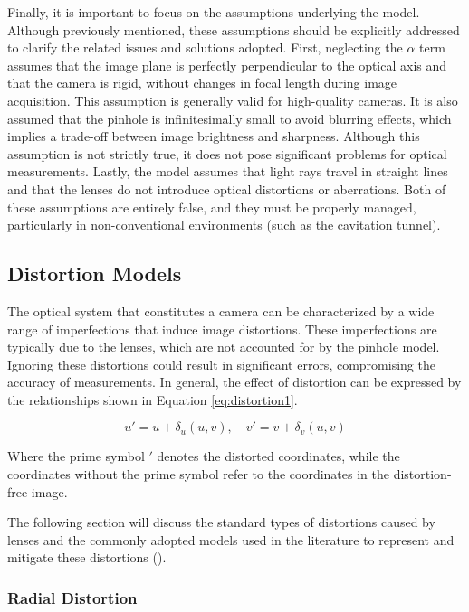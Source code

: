Finally, it is important to focus on the assumptions underlying the model. Although previously mentioned, these assumptions should be explicitly addressed to clarify the related issues and solutions adopted.
First, neglecting the $\alpha$ term assumes that the image plane is perfectly perpendicular to the optical axis and that the camera is rigid, without changes in focal length during image acquisition. This assumption is generally valid for high-quality cameras. It is also assumed that the pinhole is infinitesimally small to avoid blurring effects, which implies a trade-off between image brightness and sharpness. Although this assumption is not strictly true, it does not pose significant problems for optical measurements.
Lastly, the model assumes that light rays travel in straight lines and that the lenses do not introduce optical distortions or aberrations. Both of these assumptions are entirely false, and they must be properly managed, particularly in non-conventional environments (such as the cavitation tunnel).

\subsection{Distortion Models}

The optical system that constitutes a camera can be characterized by a wide range of imperfections that induce image distortions. These imperfections are typically due to the lenses, which are not accounted for by the pinhole model. Ignoring these distortions could result in significant errors, compromising the accuracy of measurements. In general, the effect of distortion can be expressed by the relationships shown in Equation \ref{eq:distortion1}.

\begin{equation}
  u' = u + \delta_u(u,v), \quad v' = v + \delta_v(u,v)
  \label{eq:distortion1}
\end{equation}

Where the prime symbol $'$ denotes the distorted coordinates, while the coordinates without the prime symbol refer to the coordinates in the distortion-free image.

The following section will discuss the standard types of distortions caused by lenses and the commonly adopted models used in the literature to represent and mitigate these distortions (\cite{Weng1992}).

\subsubsection{Radial Distortion}

